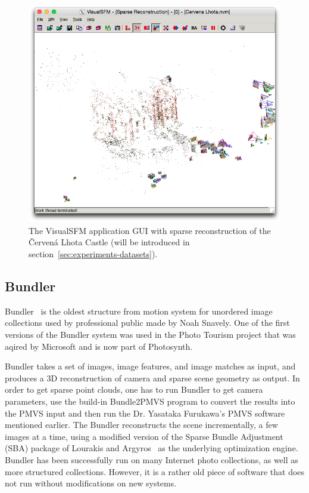\begin{figure}[ht]
	\begin{center}
		\includegraphics[keepaspectratio,width=\textwidth]{fig/VisualSFM.png}
	\end{center}
	\caption{The VisualSFM application GUI with sparse reconstruction of the Červená Lhota Castle (will be introduced in section~\ref{sec:experiments-datasets}).}
	\label{fig:visualsfm}
\end{figure}

\subsection*{Bundler}
Bundler~\cite{www:bundler} is the oldest structure from motion system for unordered image collections used by professional public made by Noah Snavely. One of the first versions of the Bundler system was used in the Photo Tourism project that was aqired by Microsoft and is now part of Photosynth. 

Bundler takes a set of images, image features, and image matches as input, and produces a 3D reconstruction of camera and sparse scene geometry as output. In order to get sparse point clouds, one has to run Bundler to get camera parameters, use the build-in Bundle2PMVS program to convert the results into the PMVS input and then run the Dr. Yasataka Furukawa's PMVS software mentioned earlier. The Bundler reconstructs the scene incrementally, a few images at a time, using a modified version of the Sparse Bundle Adjustment (SBA) package of Lourakis and Argyros~\cite{www:sba} as the underlying optimization engine. Bundler has been successfully run on many Internet photo collections, as well as more structured collections. However, it is a rather old piece of software that does not run without modifications on new systems.

